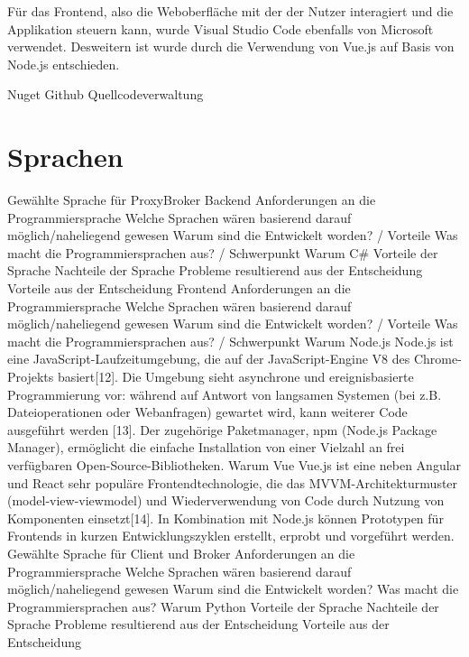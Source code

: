     
    Für das Frontend, also die Weboberfläche mit der der Nutzer interagiert und die Applikation steuern kann, wurde Visual Studio Code ebenfalls von Microsoft verwendet.
    Desweitern ist wurde durch die Verwendung von Vue.js %
    auf Basis von Node.js %
    entschieden.

    Nuget %
    Github Quellcodeverwaltung %

\section{Sprachen}
    Gewählte Sprache für ProxyBroker
    Backend
        Anforderungen an die Programmiersprache
        Welche Sprachen wären basierend darauf möglich/naheliegend gewesen
            Warum sind die Entwickelt worden? / Vorteile
            Was macht die Programmiersprachen aus? / Schwerpunkt
        Warum C\#
            Vorteile der Sprache
            Nachteile der Sprache 
            Probleme resultierend aus der Entscheidung
            Vorteile aus der Entscheidung
    Frontend
        Anforderungen an die Programmiersprache
        Welche Sprachen wären basierend darauf möglich/naheliegend gewesen
            Warum sind die Entwickelt worden? / Vorteile
            Was macht die Programmiersprachen aus? / Schwerpunkt
        Warum Node.js
            Node.js ist eine JavaScript-Laufzeitumgebung, die auf der JavaScript-Engine V8 des Chrome-Projekts basiert[12]. Die Umgebung sieht asynchrone und ereignisbasierte Programmierung vor: während auf Antwort von langsamen Systemen (bei z.B. Dateioperationen oder Webanfragen) gewartet wird, kann weiterer Code ausgeführt werden [13]. Der zugehörige Paketmanager, npm (Node.js Package Manager), ermöglicht die einfache Installation von einer Vielzahl an frei verfügbaren Open-Source-Bibliotheken. 
        Warum Vue
            Vue.js ist eine neben Angular und React sehr populäre Frontendtechnologie, die das MVVM-Architekturmuster (model-view-viewmodel) und Wiederverwendung von Code durch Nutzung von Komponenten einsetzt[14]. In Kombination mit Node.js können Prototypen für Frontends in kurzen Entwicklungszyklen erstellt, erprobt und vorgeführt werden.
    Gewählte Sprache für Client und Broker
        Anforderungen an die Programmiersprache
        Welche Sprachen wären basierend darauf möglich/naheliegend gewesen
            Warum sind die Entwickelt worden? 
            Was macht die Programmiersprachen aus?
        Warum Python
            Vorteile der Sprache
            Nachteile der Sprache 
            Probleme resultierend aus der Entscheidung
            Vorteile aus der Entscheidung
     
